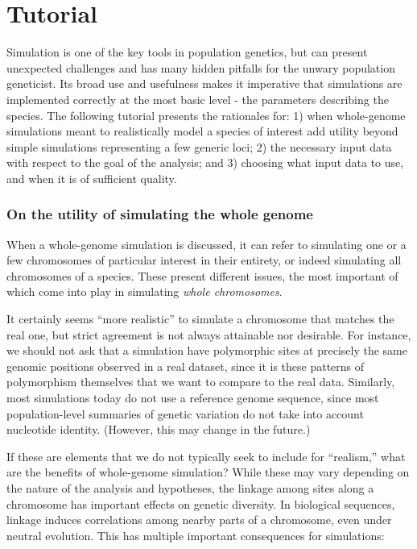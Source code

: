 \documentclass[hidelinks]{article}
\begin{document}
\hypertarget{tutorial}{%
\section*{Tutorial}\label{tutorial}}

Simulation is one of the key tools in population genetics, but can
present unexpected challenges and has many hidden pitfalls for the
unwary population geneticist. Its broad use and usefulness makes it
imperative that simulations are implemented correctly at the most basic
level - the parameters describing the species. The following tutorial
presents the rationales for: 1) when whole-genome simulations meant to
realistically model a species of interest add utility beyond simple
simulations representing a few generic loci; 2) the necessary input data
with respect to the goal of the analysis; and 3) choosing what input
data to use, and when it is of sufficient quality.

\hypertarget{on-the-utility-of-simulating-the-whole-genome}{%
\subsubsection*{On the utility of simulating the whole
genome}\label{on-the-utility-of-simulating-the-whole-genome}}

When a whole-genome simulation is discussed, it can refer to simulating
one or a few chromosomes of particular interest in their entirety, or
indeed simulating all chromosomes of a species. These present different
issues, the most important of which come into play in simulating
\emph{whole chromosomes}.

It certainly seems ``more realistic'' to simulate a chromosome that
matches the real one, but strict agreement is not always attainable nor
desirable. For instance, we should not ask that a simulation have
polymorphic sites at precisely the same genomic positions observed in a
real dataset, since it is these patterns of polymorphism themselves that
we want to compare to the real data. Similarly, most simulations today
do not use a reference genome sequence, since most population-level
summaries of genetic variation do not take into account nucleotide
identity. (However, this may change in the future.)

If these are elements that we do not typically seek to include for
``realism,'' what are the benefits of whole-genome simulation? While
these may vary depending on the nature of the analysis and hypotheses,
the linkage among sites along a chromosome has important effects on
genetic diversity. In biological sequences, linkage induces correlations
among nearby parts of a chromosome, even under neutral evolution. This
has multiple important consequences for simulations:
\end{document}
